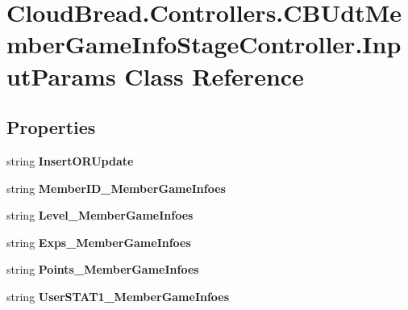 \hypertarget{a00111}{}\section{Cloud\+Bread.\+Controllers.\+C\+B\+Udt\+Member\+Game\+Info\+Stage\+Controller.\+Input\+Params Class Reference}
\label{a00111}
\subsection*{Properties}
\begin{DoxyCompactItemize}
\item 
string {\bfseries Insert\+O\+R\+Update}\hypertarget{a00111_a31a49fed186da558449d53b4562acd73}{}\label{a00111_a31a49fed186da558449d53b4562acd73}

\item 
string {\bfseries Member\+I\+D\+\_\+\+Member\+Game\+Infoes}\hypertarget{a00111_aed7bc6411619fdedcb3c491b14ac15a9}{}\label{a00111_aed7bc6411619fdedcb3c491b14ac15a9}

\item 
string {\bfseries Level\+\_\+\+Member\+Game\+Infoes}\hypertarget{a00111_aaa2d6f3f988a48f6beba7c6393e516e7}{}\label{a00111_aaa2d6f3f988a48f6beba7c6393e516e7}

\item 
string {\bfseries Exps\+\_\+\+Member\+Game\+Infoes}\hypertarget{a00111_a50e7ca4d5dfa6ab819b0ad0e555aef38}{}\label{a00111_a50e7ca4d5dfa6ab819b0ad0e555aef38}

\item 
string {\bfseries Points\+\_\+\+Member\+Game\+Infoes}\hypertarget{a00111_a02e6c8a9c4a2ba657c28ae3163b4585d}{}\label{a00111_a02e6c8a9c4a2ba657c28ae3163b4585d}

\item 
string {\bfseries User\+S\+T\+A\+T1\+\_\+\+Member\+Game\+Infoes}\hypertarget{a00111_ac5dd84726ba21a6e40fafc74f460f175}{}\label{a00111_ac5dd84726ba21a6e40fafc74f460f175}


\end{DoxyCompactItemize}
